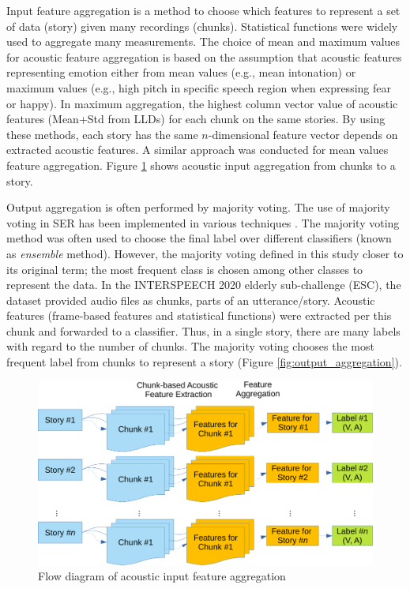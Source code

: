 Input feature aggregation is a method to choose which features to represent a
set of data (story) given many recordings (chunks). Statistical functions were
widely used to aggregate many measurements. The choice of mean and maximum
values for acoustic feature aggregation is based on the assumption that
acoustic features representing emotion either from mean values (e.g., mean
intonation) or maximum values (e.g., high pitch in specific speech region when
expressing fear or happy). In maximum aggregation, the highest column vector
value of acoustic features (Mean+Std from LLDs) for each chunk on the same
stories. By using these methods, each story has the same $n$-dimensional
feature vector depends on extracted acoustic features. A similar approach was
conducted for mean values feature aggregation. Figure
\ref{fig:input_aggregation} shows acoustic input aggregation from chunks to a
story. 


Output aggregation is often performed by majority voting. The use of majority
voting in SER has been implemented in various techniques \cite{Sezgin2012,
Elbarougy2019, Griol2017}. The majority voting method was often used to choose
the final label over different classifiers (known as \textit{ensemble} method).
However, the majority voting defined in this study closer to its original term;
the most frequent class is chosen among other classes to represent the data. In
the INTERSPEECH 2020 elderly sub-challenge (ESC), the dataset provided audio
files as chunks, parts of an utterance/story. Acoustic features (frame-based
features and statistical functions) were extracted per this chunk and
forwarded to a classifier. Thus, in a single story, there are many labels with
regard to the number of chunks. The majority voting chooses the most frequent
label from chunks to represent a story (Figure \ref{fig:output_aggregation}).

\begin{figure}
  \centering
  \includegraphics[width=.7\textwidth]{../fig/feature_aggregation-crop.pdf}
  \caption{Flow diagram of acoustic input feature aggregation}
  \label{fig:input_aggregation}
\end{figure}

